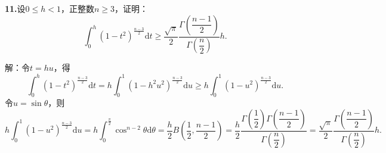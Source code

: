 \documentclass[12pt, a4paper]{article}
\newcommand{\dif}{\mathrm{d}}
\begin{document}
\textbf{11.}设\(0 \leq h < 1\)，正整数\(n \geq 3\)，证明：
\[\int_0^h (1 - t^2)^{\frac{n - 3}{2}}\dif t \geq \frac{\sqrt{\pi}}{2}\frac{\Gamma\left(\dfrac{n - 1}{2}\right)}{\Gamma\left(\dfrac{n}{2}\right)}h.\]

解：令\(t = hu\)，得
\[\int_0^h (1 - t^2)^{\frac{n - 3}{2}}\dif t = h\int_0^1 (1 - h^2u^2)^{\frac{n - 3}{2}}\dif u \geq h\int_0^1 (1 - u^2)^{\frac{n - 3}{2}}\dif u.\]
令\(u = \sin\theta\)，则
\[h\int_0^1 (1 - u^2)^{\frac{n - 3}{2}}\dif u = h\int_{0}^{\frac{\pi}{2}} \cos^{n - 2}\theta\dif\theta = \frac{h}{2}B\left(\frac{1}{2}, \frac{n - 1}{2}\right) = \frac{h}{2}\frac{\Gamma\left(\dfrac{1}{2}\right)\Gamma\left(\dfrac{n - 1}{2}\right)}{\Gamma\left(\dfrac{n}{2}\right)} = \frac{\sqrt{\pi}}{2}\frac{\Gamma\left(\dfrac{n - 1}{2}\right)}{\Gamma\left(\dfrac{n}{2}\right)}h.\]
\end{document}
